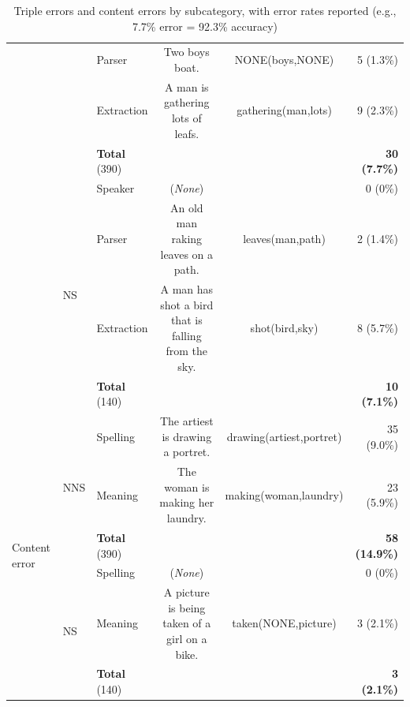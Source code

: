 \begin{table}[htb!]
\begin{center}
\begin{tabular}{|l|l|l|cc|r|}
  \cline{3-6}
  & & Parser & Two boys boat. & NONE(boys,NONE) & 5 (1.3\%) \\
  \cline{3-6}
  & & Extraction & A man is gathering lots of leafs. & gathering(man,lots) & 9 (2.3\%) \\
  \cline{3-6}
  & & \textbf{Total} (390) & & & \textbf{30 (7.7\%)} \\
 \cline{2-6}
 & \multirow{4}{*}{\begin{sideways}NS\end{sideways}} & Speaker & (\textit{None}) & & 0 (0\%) \\
 \cline{3-6}
 & & Parser & An old man raking leaves on a path. & leaves(man,path) & 2 (1.4\%) \\
 \cline{3-6}
 & & Extraction & A man has shot a bird that is falling from the sky. & shot(bird,sky) & 8 (5.7\%) \\
 \cline{3-6}
 & & \textbf{Total} (140) & & & \textbf{10 (7.1\%)} \\
 \hline
 \hline
 \multirow{6}{*}{\begin{sideways}Content error\end{sideways}} & \multirow{3}{*}{\begin{sideways}NNS\end{sideways}} & Spelling & The artiest is drawing a portret. & drawing(artiest,portret) & 35 (9.0\%) \\
 \cline{3-6}
  & & Meaning & The woman is making her laundry. & making(woman,laundry) & 23 (5.9\%) \\
 \cline{3-6}
  & & \textbf{Total} (390) & & & \textbf{58 (14.9\%)} \\
 \cline{2-6}
 & \multirow{3}{*}{\begin{sideways}NS\end{sideways}} & Spelling & (\textit{None}) & & 0 (0\%) \\
 \cline{3-6}
 & & Meaning & A picture is being taken of a girl on a bike. & taken(NONE,picture) & 3 (2.1\%) \\
 \cline{3-6}
 & & \textbf{Total} (140) & & & \textbf{3 (2.1\%)} \\
 \hline
\end{tabular}
\end{center}
\caption{Triple errors and content errors by subcategory, with error
  rates reported (e.g., 7.7\% error = 92.3\% accuracy)}
\label{tab:error-types}
\end{table}

